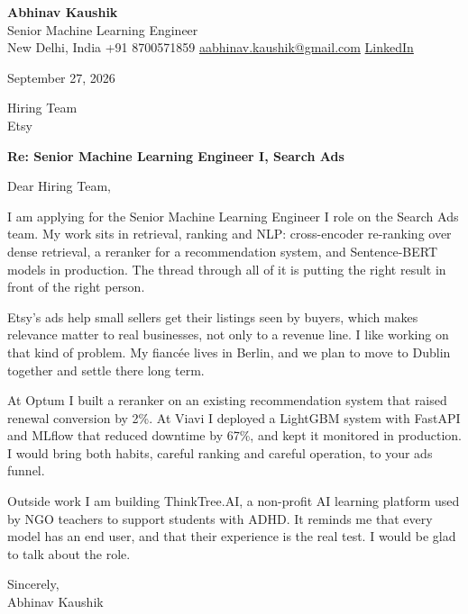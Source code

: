 \documentclass[11pt,a4paper]{article}
\begin{document}
{\Large\bfseries Abhinav Kaushik}\\
Senior Machine Learning Engineer\\
New Delhi, India \textbar{} +91 8700571859 \textbar{} \href{mailto:aabhinav.kaushik@gmail.com}{aabhinav.kaushik@gmail.com} \textbar{} \href{https://www.linkedin.com/in/abhinav-kaushik10/}{LinkedIn}  

September 27, 2026

Hiring Team\\
Etsy

\textbf{Re: Senior Machine Learning Engineer I, Search Ads}

Dear Hiring Team,

I am applying for the Senior Machine Learning Engineer I role on the Search Ads team. My work sits in retrieval, ranking and NLP: cross-encoder re-ranking over dense retrieval, a reranker for a recommendation system, and Sentence-BERT models in production. The thread through all of it is putting the right result in front of the right person.

Etsy's ads help small sellers get their listings seen by buyers, which makes relevance matter to real businesses, not only to a revenue line. I like working on that kind of problem. My fiancée lives in Berlin, and we plan to move to Dublin together and settle there long term.

At Optum I built a reranker on an existing recommendation system that raised renewal conversion by 2\%. At Viavi I deployed a LightGBM system with FastAPI and MLflow that reduced downtime by 67\%, and kept it monitored in production. I would bring both habits, careful ranking and careful operation, to your ads funnel.

Outside work I am building ThinkTree.AI, a non-profit AI learning platform used by NGO teachers to support students with ADHD. It reminds me that every model has an end user, and that their experience is the real test. I would be glad to talk about the role.

Sincerely,\\[4pt]
Abhinav Kaushik
\end{document}
